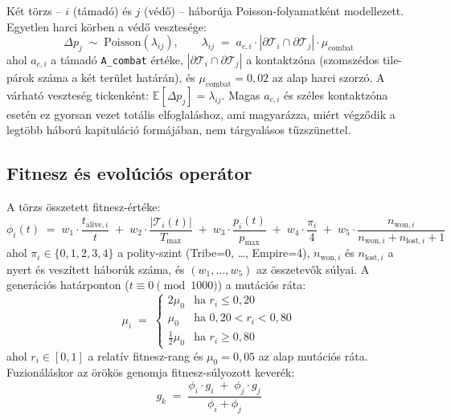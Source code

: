 ﻿\documentclass[a4paper,12pt]{report}
\begin{document}
Két törzs -- $i$ (támadó) és $j$ (védő) -- háborúja Poisson-folyamatként modellezett.
Egyetlen harci körben a védő vesztesége:
\begin{equation}
\Delta p_j \;\sim\; \mathrm{Poisson}(\lambda_{ij}), \qquad
\lambda_{ij} \;=\; a_{c,i}\cdot|\partial\mathcal{T}_i \cap \partial\mathcal{T}_j|\cdot\mu_{\text{combat}}
\end{equation}
ahol $a_{c,i}$ a támadó \texttt{A\_combat} értéke, $|\partial\mathcal{T}_i \cap \partial\mathcal{T}_j|$
a kontaktzóna (szomszédos tile-párok száma a két terület határán), és $\mu_{\text{combat}} = 0{,}02$
az alap harci szorzó. A várható veszteség tickenként: $\mathbb{E}[\Delta p_j] = \lambda_{ij}$.
Magas $a_{c,i}$ és széles kontaktzóna esetén ez gyorsan vezet totális elfoglaláshoz, ami
magyarázza, miért végződik a legtöbb háború kapituláció formájában, nem tárgyalásos tűzszünettel.

\subsection*{Fitnesz és evolúciós operátor}

A törzs összetett fitnesz-értéke:
\begin{equation}
\phi_i(t) \;=\; w_1\cdot\frac{t_{\text{alive},i}}{t} \;+\; w_2\cdot\frac{|\mathcal{T}_i(t)|}{T_{\max}} \;+\; w_3\cdot\frac{p_i(t)}{p_{\max}} \;+\; w_4\cdot\frac{\pi_i}{4} \;+\; w_5\cdot\frac{n_{\text{won},i}}{n_{\text{won},i}+n_{\text{lost},i}+1}
\end{equation}
ahol $\pi_i \in \{0,1,2,3,4\}$ a polity-szint (Tribe=0, \ldots, Empire=4), $n_{\text{won},i}$
és $n_{\text{lost},i}$ a nyert és veszített háborúk száma, és $(w_1,\ldots,w_5)$ az összetevők
súlyai. A generációs határponton ($t \equiv 0 \pmod{1000}$) a mutációs ráta:
\begin{equation}
\mu_i \;=\;
\begin{cases}
2\mu_0 & \text{ha } r_i \leq 0{,}20 \\
\mu_0  & \text{ha } 0{,}20 < r_i < 0{,}80 \\
\tfrac{1}{2}\mu_0 & \text{ha } r_i \geq 0{,}80
\end{cases}
\end{equation}
ahol $r_i \in [0,1]$ a relatív fitnesz-rang és $\mu_0 = 0{,}05$ az alap mutációs ráta.
Fuzionáláskor az örökös genomja fitnesz-súlyozott keverék:
\begin{equation}
g_k \;=\; \frac{\phi_i\cdot g_i \;+\; \phi_j\cdot g_j}{\phi_i + \phi_j}
\end{equation}
\end{document}
